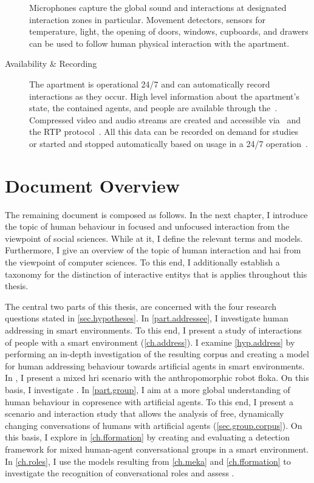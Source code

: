 \begin{description}
Microphones capture the global sound and interactions at designated interaction zones in particular.
Movement detectors, sensors for temperature, light, the opening of doors, windows, cupboards, and drawers can be used to follow human physical interaction with the \gls{apartment}.
\item[Availability \& Recording] The \gls{apartment} is operational 24/7 and can automatically record interactions as they occur.
High level information about the \gls{apartment}'s state, the contained agents, and people are available through the~.
Compressed video and audio streams are created and accessible via~ and the RTP protocol~\cite{RFC3550}.
All this data can be recorded on demand for studies~\cite{Holthaus2016a} or started and stopped automatically based on usage in a 24/7 operation~\cite{Richter2018}.
\end{description}

\section{Document Overview}

The remaining document is composed as follows.
In the next chapter, I introduce the topic of human  behaviour in focused and \gls{unfocused interaction} from the viewpoint of social sciences.
While at it, I define the relevant terms and models.
Furthermore, I give an overview of the topic of human interaction and \gls{hai} from the viewpoint of computer sciences.
To this end, I additionally establish a taxonomy for the distinction of \glspl{interactive entity} that is applies throughout this thesis.

The central two parts of this thesis, are concerned with the four research questions stated in \cref{sec.hypotheses}.
In \cref{part.addressee}, I investigate human addressing in \glspl{smart environment}.
To this end, I present a study of \naive{} interactions of people with a \gls{smart environment} (\cref{ch.address}).
I examine \cref{hyp.address} by performing an in-depth investigation of the resulting corpus and creating a model for human addressing behaviour towards \glspl{artificial agent} in \glspl{smart environment}.
In , I present a mixed \gls{hri} scenario with the anthropomorphic \gls{robot} \gls{floka}.
On this basis, I investigate .
In \cref{part.group}, I aim at a more global understanding of human behaviour in \gls{copresence} with \glspl{artificial agent}.
To this end, I present a scenario and interaction study that allows the analysis of free, dynamically changing \glspl{conversation} of humans with \glspl{artificial agent} (\cref{sec.group.corpus}).
On this basis, I explore  in \cref{ch.fformation} by creating and evaluating a detection framework for mixed human-agent \glspl{conversational group} in a \gls{smart environment}.
In \cref{ch.roles}, I use the models resulting from \cref{ch.meka} and \cref{ch.fformation} to investigate the recognition of \glspl{conversational role} and assess .

